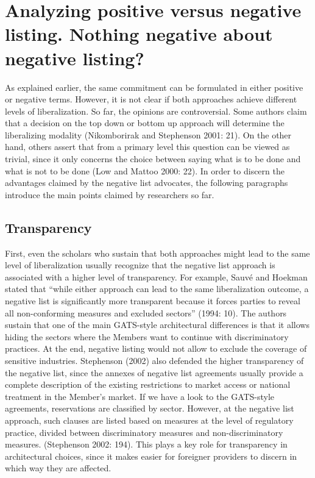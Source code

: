 \documentclass{article}
\begin{document}

\section{Analyzing positive versus negative listing. Nothing negative about negative listing?}

As explained earlier, the same commitment can be formulated in either positive or negative terms. However, it is not clear if both approaches achieve different levels of liberalization. So far, the opinions are controversial. Some authors claim that a decision on the top down or bottom up approach will determine the liberalizing modality (Nikomborirak and Stephenson 2001: 21). On the other hand, others assert that from a primary level this question can be viewed as trivial, since it only concerns the choice between saying what is to be done and what is not to be done (Low and Mattoo 2000: 22). In order to discern the advantages claimed by the negative list advocates, the following paragraphs introduce the main points claimed by researchers so far.

\subsection{Transparency}

First, even the scholars who sustain that both approaches might lead to the same level of liberalization usually recognize that the negative list approach is associated with a higher level of transparency. For example, Sauvé and Hoekman stated that “while either approach can lead to the same liberalization outcome, a negative list is significantly more transparent because it forces parties to reveal all non-conforming measures and excluded sectors” (1994: 10). The authors sustain that one of the main GATS-style architectural differences is that it allows hiding the sectors where the Members want to continue with discriminatory practices. At the end, negative listing would not allow to exclude the coverage of sensitive industries. Stephenson (2002) also defended the higher transparency of the negative list, since the annexes of negative list agreements usually provide a complete description of the existing restrictions to market access or national treatment in the Member’s market. If we have a look to the GATS-style agreements, reservations are classified by sector. However, at the negative list approach, such clauses are listed based on measures at the level of regulatory practice, divided between discriminatory measures and non-discriminatory measures. (Stephenson 2002: 194). This plays a key role for transparency in architectural choices, since it makes easier for foreigner providers to discern in which way they are affected.
\end{document}
